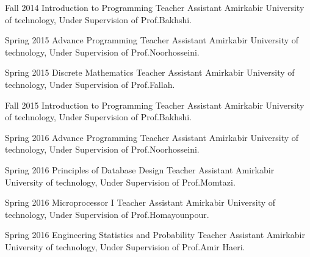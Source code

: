 \documentclass[]{friggeri-cv} %
\begin{document}
\begin{entrylist}

\entry
{Fall 2014}
{Introduction to Programming}
{Teacher Assistant}
{Amirkabir University of technology, Under Supervision of Prof.Bakhshi.}


\entry
{Spring 2015}
{Advance Programming}
{Teacher Assistant}
{Amirkabir University of technology, Under Supervision of Prof.Noorhosseini.}


\entry
{Spring 2015}
{Discrete Mathematics}
{Teacher Assistant}
{Amirkabir University of technology, Under Supervision of Prof.Fallah.}


\entry
{Fall 2015}
{Introduction to Programming}
{Teacher Assistant}
{Amirkabir University of technology, Under Supervision of Prof.Bakhshi.}


\entry
{Spring 2016}
{Advance Programming}
{Teacher Assistant}
{Amirkabir University of technology, Under Supervision of Prof.Noorhosseini.}


\entry
{Spring 2016}
{Principles of Database Design}
{Teacher Assistant}
{Amirkabir University of technology, Under Supervision of Prof.Momtazi.}


\entry
{Spring 2016}
{Microprocessor I}
{Teacher Assistant}
{Amirkabir University of technology, Under Supervision of Prof.Homayounpour.}


\entry
{Spring 2016}
{Engineering Statistics and Probability}
{Teacher Assistant}
{Amirkabir University of technology, Under Supervision of Prof.Amir Haeri.}



\end{entrylist}

\end{document}
